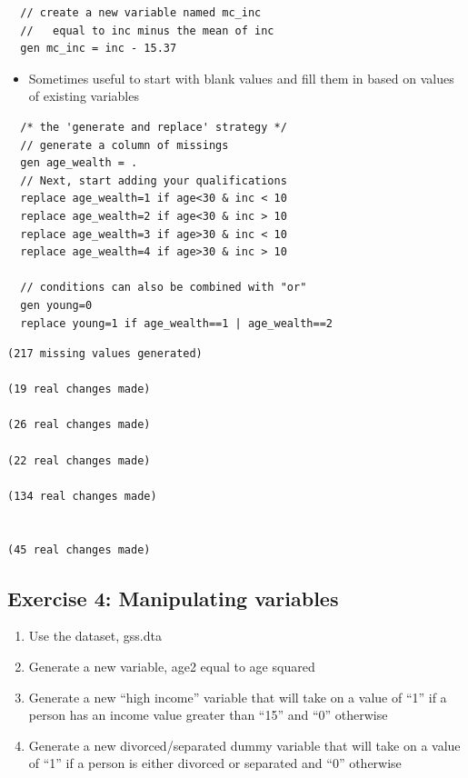 \documentclass[]{book}
\providecommand{\tightlist}{%
  \setlength{\itemsep}{0pt}\setlength{\parskip}{0pt}}
\begin{document}
\begin{verbatim}
  // create a new variable named mc_inc
  //   equal to inc minus the mean of inc
  gen mc_inc = inc - 15.37  
\end{verbatim}

\begin{itemize}
\tightlist
\item
  Sometimes useful to start with blank values and fill them in based on
  values of existing variables
\end{itemize}

\begin{verbatim}
  /* the 'generate and replace' strategy */ 
  // generate a column of missings
  gen age_wealth = .
  // Next, start adding your qualifications
  replace age_wealth=1 if age<30 & inc < 10
  replace age_wealth=2 if age<30 & inc > 10
  replace age_wealth=3 if age>30 & inc < 10
  replace age_wealth=4 if age>30 & inc > 10

  // conditions can also be combined with "or"
  gen young=0
  replace young=1 if age_wealth==1 | age_wealth==2
\end{verbatim}

\begin{verbatim}
(217 missing values generated)

(19 real changes made)

(26 real changes made)

(22 real changes made)

(134 real changes made)


(45 real changes made)
\end{verbatim}

\subsection{Exercise 4: Manipulating
variables}\label{exercise-4-manipulating-variables}

\begin{enumerate}
\def\labelenumi{\arabic{enumi}.}
\tightlist
\item
  Use the dataset, gss.dta
\item
  Generate a new variable, age2 equal to age squared
\item
  Generate a new ``high income'' variable that will take on a value of
  ``1'' if a person has an income value greater than ``15'' and ``0''
  otherwise
\item
  Generate a new divorced/separated dummy variable that will take on a
  value of ``1'' if a person is either divorced or separated and ``0''
  otherwise
\end{enumerate}
\end{document}
